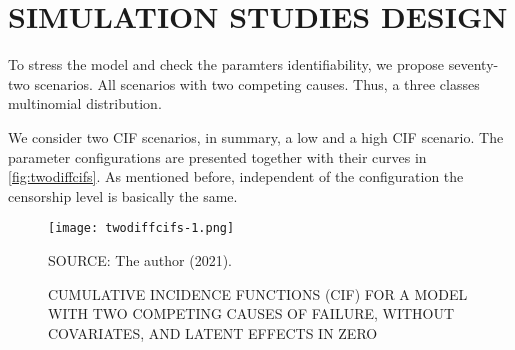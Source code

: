 \section{SIMULATION STUDIES DESIGN}
\label{cap:data}

To stress the model and check the paramters identifiability, we propose
seventy-two scenarios. All scenarios with two competing causes. Thus, a
three classes multinomial distribution.

We consider two CIF scenarios, in summary, a low and a high CIF
scenario. The parameter configurations are presented together with their
curves in \autoref{fig:twodiffcifs}. As mentioned before, independent of
the configuration the censorship level is basically the same.

\begin{figure}[H]
 \setlength{\abovecaptionskip}{.0001pt}
 \caption{CUMULATIVE INCIDENCE FUNCTIONS (CIF) FOR A MODEL WITH TWO
          COMPETING CAUSES OF FAILURE, WITHOUT COVARIATES, AND LATENT
          EFFECTS IN ZERO}
 \vspace{0.2cm}\centering
 \texttt{[image: twodiffcifs-1.png]}\\
 \begin{footnotesize}
  SOURCE: The author (2021).
 \end{footnotesize}
 \label{fig:twodiffcifs}
\end{figure}

